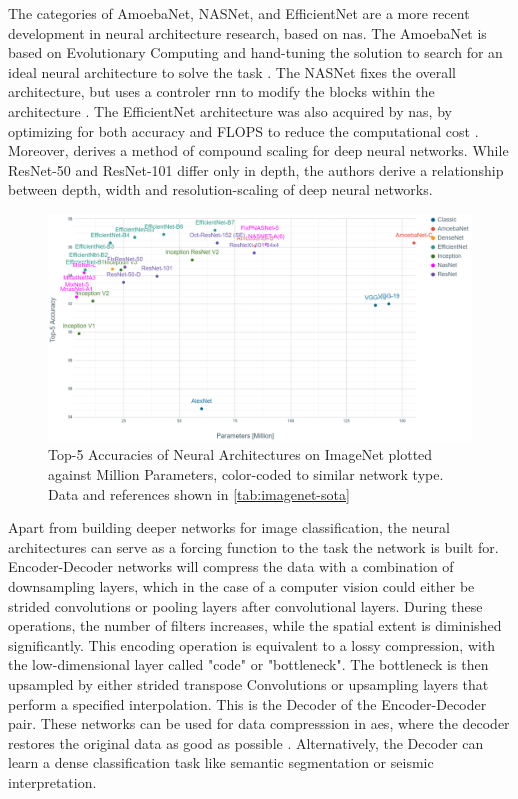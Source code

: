 The categories of AmoebaNet, NASNet, and EfficientNet are a more recent development in neural architecture research, based on \acf{nas}. The AmoebaNet is based on Evolutionary Computing and hand-tuning the solution to search for an ideal neural architecture to solve the task \citep{real2019regularized}. The NASNet fixes the overall architecture, but uses a controler \ac{rnn} to modify the blocks within the architecture \citep{zoph2018learning}. The EfficientNet architecture was also acquired by \ac{nas}, by optimizing for both accuracy and FLOPS to reduce the computational cost \citep{tan2019efficientnet}. Moreover, \citet{tan2019efficientnet} derives a method of compound scaling for deep neural networks. While ResNet-50 and ResNet-101 differ only in depth, the authors derive a relationship between depth, width and resolution-scaling of deep neural networks.

\begin{figure}[H]
    \centering
    \includegraphics[width=1.1\textwidth]{figures/imagenetsota.png}
    \caption{Top-5 Accuracies of Neural Architectures on ImageNet plotted against Million Parameters, color-coded to similar network type. Data and references shown in \cref{tab:imagenet-sota}}
    \label{fig:cnnsota}
\end{figure}

Apart from building deeper networks for image classification, the neural architectures can serve as a  forcing function to the task the network is built for. Encoder-Decoder networks will compress the data with a combination of downsampling layers, which in the case of a computer vision could either be strided convolutions or pooling layers after convolutional layers. During these operations, the number of filters increases, while the spatial extent is diminished significantly. This encoding operation is equivalent to a lossy compression, with the low-dimensional layer called "code" or "bottleneck". The bottleneck is then upsampled by either strided transpose Convolutions or upsampling layers that perform a specified interpolation. This is the Decoder of the Encoder-Decoder pair. These networks can be used for data compresssion in \acp{ae}, where the decoder restores the original data as good as possible \citep{hinton2006reducing}. Alternatively, the Decoder can learn a dense classification task like semantic segmentation or seismic interpretation.

